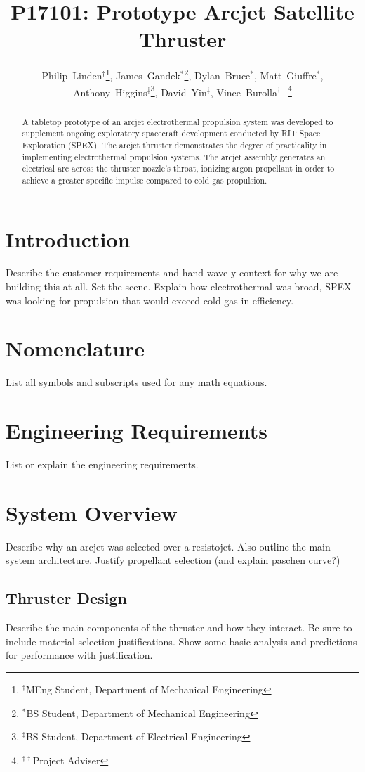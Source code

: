 \documentclass[journal]{IEEEtran}
\title{P17101: Prototype Arcjet Satellite Thruster}
\author{
  Philip~Linden$^{\dagger}$\thanks{$^{\dagger}$MEng Student, Department of Mechanical Engineering},
  James~Gandek$^{*}$\thanks{$^{*}$BS Student, Department of Mechanical Engineering},
  Dylan~Bruce$^{*}$,
  Matt~Giuffre$^{*}$,
  Anthony~Higgins$^{\ddagger}$\thanks{$^{\ddagger}$BS Student, Department of Electrical Engineering},
  David~Yin$^{\ddagger}$,
  Vince~Burolla$^{\dagger\dagger}$\thanks{$^{\dagger\dagger}$Project Adviser}
}
\begin{document}
\maketitle


\begin{abstract}
A tabletop prototype of an arcjet electrothermal propulsion system was developed to supplement ongoing exploratory spacecraft development conducted by RIT Space Exploration (SPEX). The arcjet thruster demonstrates the degree of practicality in implementing electrothermal propulsion systems. The arcjet assembly generates an electrical arc across the thruster nozzle's throat, ionizing argon propellant in order to achieve a greater specific impulse compared to cold gas propulsion.
\end{abstract}
\section{Introduction}
Describe the customer requirements and hand wave-y context for why we are building this at all. Set the scene. Explain how electrothermal was broad, SPEX was looking for propulsion that would exceed cold-gas in efficiency.

\section{Nomenclature}
List all symbols and subscripts used for any math equations.

\section{Engineering Requirements}
List or explain the engineering requirements.

\section{System Overview}
Describe why an arcjet was selected over a resistojet.
Also outline the main system architecture.
Justify propellant selection (and explain paschen curve?)

\subsection{Thruster Design}
Describe the main components of the thruster and how they interact. Be sure to include material selection justifications. Show some basic analysis and predictions for performance with justification.
\end{document}
